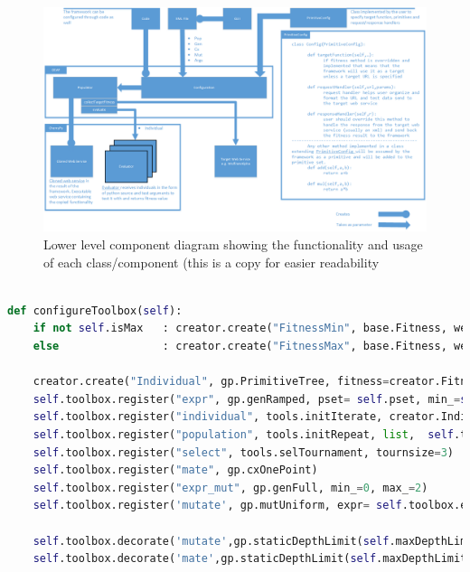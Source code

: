 \begin{landscape}
\begin{figure}[htp]
\centering
\includegraphics[scale=0.7]{Figures/Class.png}
\caption{Lower level component diagram showing the functionality and usage of each class/component (this is a copy for easier readability}
\label{fig:classdi}
\end{figure}
\end{landscape}

\begin{landscape}
\begin{lstlisting}[language=Python,caption={The core method in Configuration class that configures the DEAP framework},label={lst:config}]

def configureToolbox(self):
    if not self.isMax   : creator.create("FitnessMin", base.Fitness, weights=(-1.0,))
    else                : creator.create("FitnessMax", base.Fitness, weights=(-1.0,))

    creator.create("Individual", gp.PrimitiveTree, fitness=creator.FitnessMin, pset=self.pset)
    self.toolbox.register("expr", gp.genRamped, pset= self.pset, min_=self.depthInitialMin, max_=self.depthInitialMax)
    self.toolbox.register("individual", tools.initIterate, creator.Individual,  self.toolbox.expr)
    self.toolbox.register("population", tools.initRepeat, list,  self.toolbox.individual)
    self.toolbox.register("select", tools.selTournament, tournsize=3)
    self.toolbox.register("mate", gp.cxOnePoint)
    self.toolbox.register("expr_mut", gp.genFull, min_=0, max_=2)
    self.toolbox.register('mutate', gp.mutUniform, expr= self.toolbox.expr_mut)

	self.toolbox.decorate('mutate',gp.staticDepthLimit(self.maxDepthLimit))
    self.toolbox.decorate('mate',gp.staticDepthLimit(self.maxDepthLimit))
\end{lstlisting}
\end{landscape}	